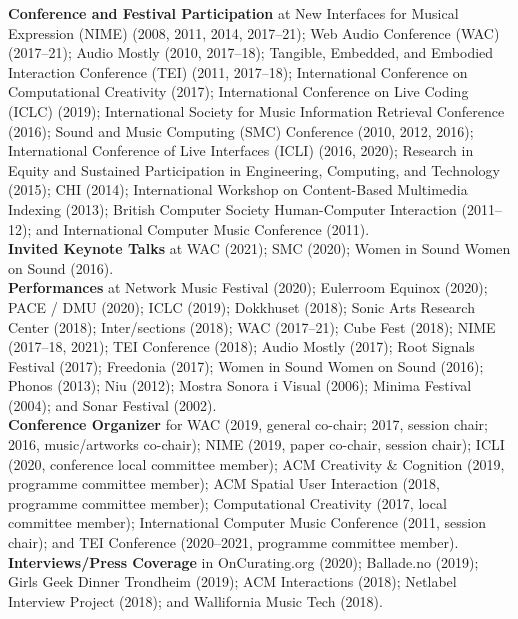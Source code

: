 \documentclass[10pt, a4paper]{article}
\begin{document}
{\textbf{Conference and Festival Participation}} at New Interfaces for Musical Expression (NIME) (2008, 2011, 2014, 2017--21); Web Audio Conference (WAC) (2017--21); Audio Mostly (2010, 2017--18); Tangible, Embedded, and Embodied Interaction Conference (TEI) (2011, 2017--18); International Conference on Computational Creativity (2017); International Conference on Live Coding (ICLC) (2019); International Society for Music Information Retrieval Conference (2016); Sound and Music Computing (SMC) Conference (2010, 2012, 2016); International Conference of Live Interfaces (ICLI) (2016, 2020); Research in Equity and Sustained Participation in Engineering, Computing, and Technology (2015); CHI (2014); International Workshop on Content-Based Multimedia Indexing (2013); British Computer Society Human-Computer Interaction (2011--12); and International Computer Music Conference (2011).\\

{\textbf{Invited Keynote Talks}} at WAC (2021); SMC (2020); Women in Sound Women on Sound (2016).\\

{\textbf{Performances}} at Network Music Festival (2020); Eulerroom Equinox (2020); PACE / DMU (2020); ICLC (2019); Dokkhuset (2018); Sonic Arts Research Center (2018); Inter/sections (2018); WAC (2017--21); Cube Fest (2018); NIME (2017--18, 2021); TEI Conference (2018); Audio Mostly (2017); Root Signals Festival (2017); Freedonia (2017); Women in Sound Women on Sound (2016); Phonos (2013); Niu (2012); Mostra Sonora i Visual (2006); Minima Festival (2004); and Sonar Festival (2002).\\

{\textbf{Conference Organizer}} for WAC (2019, general co-chair; 2017, session chair; 2016, music/artworks co-chair); NIME (2019, paper co-chair, session chair); ICLI (2020, conference local committee member); ACM Creativity \& Cognition (2019, programme committee member); ACM Spatial User Interaction (2018, programme committee member); Computational Creativity (2017, local committee member); International Computer Music Conference (2011, session chair); and TEI Conference (2020--2021, programme committee member).\\

{\textbf{Interviews/Press Coverage}} in OnCurating.org (2020); Ballade.no (2019); Girls Geek Dinner Trondheim (2019); ACM Interactions (2018); Netlabel Interview Project (2018); and Wallifornia Music Tech (2018).\\
\end{document}
